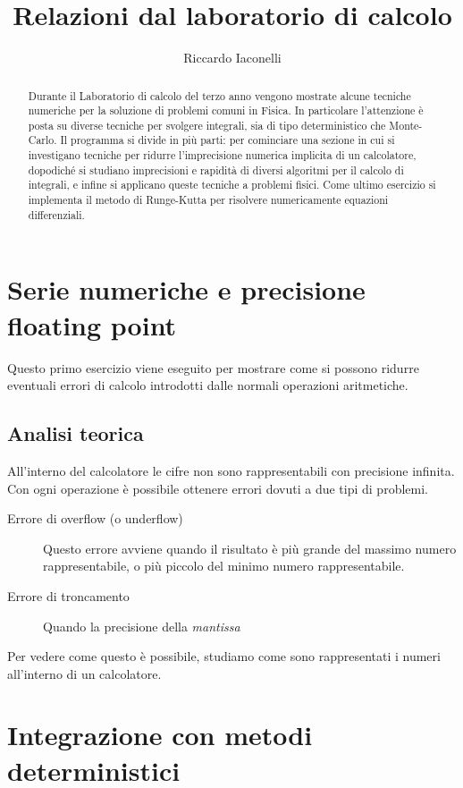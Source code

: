 \documentclass[a4paper,10pt]{article}
\title{Relazioni dal laboratorio di calcolo}
\author{Riccardo Iaconelli}
\begin{document}
\maketitle

\begin{abstract}
Durante il Laboratorio di calcolo del terzo anno vengono mostrate alcune tecniche numeriche per la soluzione di problemi comuni in Fisica. In particolare l'attenzione è posta su diverse tecniche per svolgere integrali, sia di tipo deterministico che Monte-Carlo. Il programma si divide in più parti: per cominciare una sezione in cui si investigano tecniche per ridurre l'imprecisione numerica implicita di un calcolatore, dopodiché si studiano imprecisioni e rapidità di diversi algoritmi per il calcolo di integrali, e infine si applicano queste tecniche a problemi fisici. Come ultimo esercizio si implementa il metodo di Runge-Kutta per risolvere numericamente equazioni differenziali.
\end{abstract}
\clearpage

\section{Serie numeriche e precisione floating point}
Questo primo esercizio viene eseguito per mostrare come si possono ridurre eventuali errori di calcolo introdotti dalle normali operazioni aritmetiche.

\subsection{Analisi teorica}
All'interno del calcolatore le cifre non sono rappresentabili con precisione infinita. Con ogni operazione è possibile ottenere errori dovuti a due tipi di problemi.
\begin{description}
 \item[Errore di overflow (o underflow)] Questo errore avviene quando il risultato è più grande del massimo numero rappresentabile, o più piccolo del minimo numero rappresentabile.
 \item[Errore di troncamento] Quando la precisione della \textit{mantissa} 
\end{description}

Per vedere come questo è possibile, studiamo come sono rappresentati i numeri all'interno di un calcolatore.

\section{Integrazione con metodi deterministici}
\end{document}
